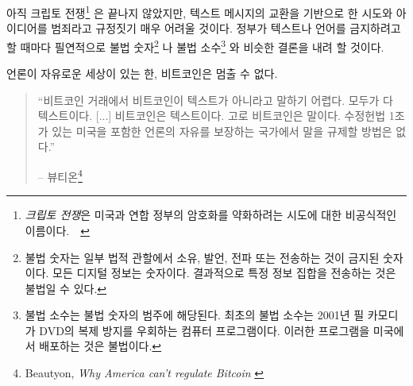 아직 크립토 전쟁\footnote{\textit{크립토 전쟁}은 미국과 연합 정부의 암호화를 약화하려는 시도에 대한 비공식적인 이름이다.~\cite{eff-cryptowars}~\cite{wiki:cryptowars}} 
은 끝나지 않았지만, 
텍스트 메시지의 교환을 기반으로 한 시도와 아이디어를 범죄라고 규정짓기 매우 어려울 것이다.
정부가 텍스트나 언어를 금지하려고 할 때마다 필연적으로 불법 숫자\footnote{불법 숫자는 일부 법적 관할에서 소유, 발언, 전파 또는 전송하는 것이 금지된 숫자이다. 모든 디지털 정보는 숫자이다.
결과적으로 특정 정보 집합을 전송하는 것은 불법일 수 있다.\cite{wiki:illegal-number}}
나 불법 소수\footnote{불법 소수는 불법 숫자의 범주에 해당된다. 최초의 불법 소수는 2001년 필 카모디가 DVD의 복제 방지를 우회하는 컴퓨터 프로그램이다. 이러한 프로그램을 미국에서 배포하는 것은 불법이다.\cite{wiki:illegal-prime}}
와 비슷한 결론을 내려 할 것이다.

언론이 자유로운 세상이 있는 한, 비트코인은 멈출 수 없다.

\begin{quotation}\begin{samepage}
\enquote{비트코인 거래에서 비트코인이 텍스트가 아니라고 말하기 어렵다. 모두가 다 텍스트이다. [...]
비트코인은 텍스트이다. 고로 비트코인은 말이다. 
수정헌법 1조가 있는 미국을 포함한 언론의 자유를 보장하는 국가에서 말을 규제할 방법은 없다.}
\begin{flushright} -- 뷰티온\footnote{Beautyon, \textit{Why America can't regulate
Bitcoin} \cite{america-regulate-bitcoin}}
\end{flushright}\end{samepage}\end{quotation}

